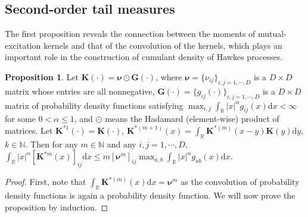 \documentclass[11pt]{article}
\numberwithin{equation}{section}
\theoremstyle{plain}
\theoremstyle{definition}
\theoremstyle{definition}
\theoremstyle{assumption}
\theoremstyle{proposition}
\newtheorem{proposition}{Proposition}[section]
\theoremstyle{proposition}
\theoremstyle{example}
\theoremstyle{lemma}
\theoremstyle{theorem}
\theoremstyle{remark}
\begin{document}
\subsection{Second-order tail measures}
The first proposition reveals the connection between the moments of mutual-excitation kernels and that of the convolution of the kernels, which plays an important role in the construction of cumulant density of Hawkes processes.
\begin{proposition}\label{alpha_moment_convolution_prop}
Let $\boldsymbol{K}(\cdot) = \boldsymbol{\nu}\odot\boldsymbol{G}(\cdot)$, where $\boldsymbol{\nu} = \{\nu_{ij}\}_{i,j=1,\cdots,D}$ is a $D\times D$ matrix whose entries are all nonnegative, $\boldsymbol{G}(\cdot)=\{g_{ij}(\cdot)\}_{i,j=1,\cdots,D}$ is a $D\times D$ matrix of probability density functions satisfying $\max_{i,j}\int_{\mathbb{R}}|x|^{\alpha}g_{ij}(x)\mathrm{d}x<\infty$ for some $0<\alpha\leqslant 1$, and $\odot$ means the Hadamard (element-wise) product of matrices. Let $\boldsymbol{K}^{*1}(\cdot) = \boldsymbol{K}(\cdot)$, $\boldsymbol{K}^{*(m+1)}(x) = \int_{\mathbb
R}\boldsymbol{K}^{*(m)}(x - y)\boldsymbol{K}(y)\mathrm{d}y$, $k\in\mathbb{N}$. Then for any $m\in\mathbb{N}$ and any $i,j=1,\cdots,D$, $\int_{\mathbb{R}}|x|^{\alpha}[\boldsymbol{K}^{*m}(x)]_{ij}\mathrm{d}x\leqslant m[\boldsymbol{\nu}^m]_{ij}\max_{a,b}\int_{\mathbb{R}}|x|^{\alpha}g_{ab}(x)\mathrm{d}x$.
\begin{proof}
First, note that $\int_{\mathbb{R}}\boldsymbol{K}^{*(m)}(x)\mathrm{d}x = \boldsymbol{\nu}^m$ as the convolution of probability density functions is again a probability density function. We will now prove the proposition by induction.


\end{proof}
\end{proposition}
\end{document}
